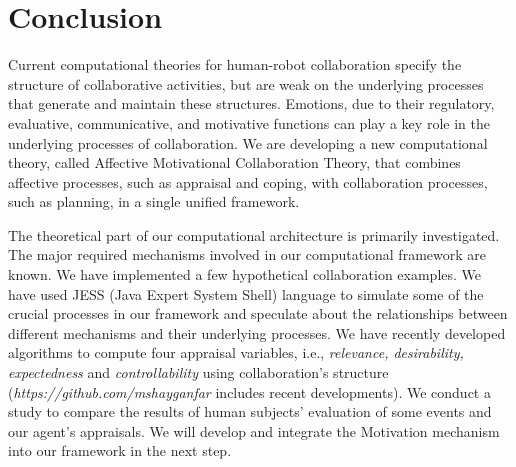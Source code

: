 \documentclass[letterpaper]{article}
\begin{document}
\vspace*{-3mm}
\section{Conclusion}

Current computational theories for human-robot collaboration specify the
structure of collaborative activities, but are weak on the underlying processes
that generate and maintain these structures. Emotions, due to their regulatory,
evaluative, communicative, and motivative functions can play a key role in the
underlying processes of collaboration. We are developing a new computational
theory, called Affective Motivational Collaboration Theory, that combines
affective processes, such as appraisal and coping, with collaboration processes,
such as planning, in a single unified framework.

The theoretical part of our computational architecture is primarily
investigated. The major required mechanisms involved in our computational
framework are known. We have implemented a few hypothetical collaboration
examples. We have used JESS (Java Expert System Shell) language to simulate some
of the crucial processes in our framework and speculate about the relationships
between different mechanisms and their underlying processes. We have recently
developed algorithms to compute four appraisal variables, i.e.,
\textit{relevance, desirability, expectedness} and \textit{controllability}
using collaboration's structure (\textit{https://github.com/mshayganfar}
includes recent developments). We conduct a study to compare the results of
human subjects' evaluation of some events and our agent's appraisals. We will
develop and integrate the Motivation mechanism into our framework in the next
step.


\vspace*{-3mm}



\end{document}
